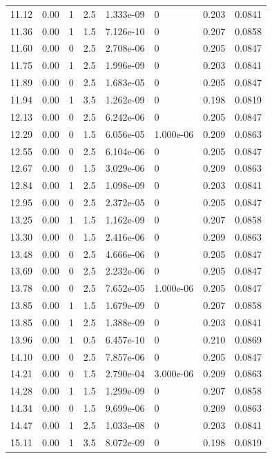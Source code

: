\documentclass[preview]{standalone}
\begin{document}
{{{\begin{tabular}{L{1.2cm}C{1.2cm} C{0.3cm}C{0.5cm} C{1.4cm}C{1.4cm} C{1.4cm}C{1.4cm}}
  11.12  &  0.00  & 1     & 2.5 &  1.333e-09  & 0  & 0.203 &  0.0841   \\ 
  11.36  &  0.00  & 1     & 1.5 &  7.126e-10  & 0  & 0.207 &  0.0858   \\ 
  11.60  &  0.00  & 0     & 2.5 &  2.708e-06  & 0  & 0.205 &  0.0847   \\ 
  11.75  &  0.00  & 1     & 2.5 &  1.996e-09  & 0  & 0.203 &  0.0841   \\ 
  11.89  &  0.00  & 0     & 2.5 &  1.683e-05  & 0  & 0.205 &  0.0847   \\ 
  11.94  &  0.00  & 1     & 3.5 &  1.262e-09  & 0  & 0.198 &  0.0819   \\ 
  12.13  &  0.00  & 0     & 2.5 &  6.242e-06  & 0  & 0.205 &  0.0847   \\ 
  12.29  &  0.00  & 0     & 1.5 &  6.056e-05  & 1.000e-06  & 0.209 &  0.0863   \\ 
  12.55  &  0.00  & 0     & 2.5 &  6.104e-06  & 0  & 0.205 &  0.0847   \\ 
  12.67  &  0.00  & 0     & 1.5 &  3.029e-06  & 0  & 0.209 &  0.0863   \\ 
  12.84  &  0.00  & 1     & 2.5 &  1.098e-09  & 0  & 0.203 &  0.0841   \\ 
  12.95  &  0.00  & 0     & 2.5 &  2.372e-05  & 0  & 0.205 &  0.0847   \\ 
  13.25  &  0.00  & 1     & 1.5 &  1.162e-09  & 0  & 0.207 &  0.0858   \\ 
  13.30  &  0.00  & 0     & 1.5 &  2.416e-06  & 0  & 0.209 &  0.0863   \\ 
  13.48  &  0.00  & 0     & 2.5 &  4.666e-06  & 0  & 0.205 &  0.0847   \\ 
  13.69  &  0.00  & 0     & 2.5 &  2.232e-06  & 0  & 0.205 &  0.0847   \\ 
  13.78  &  0.00  & 0     & 2.5 &  7.652e-05  & 1.000e-06  & 0.205 &  0.0847   \\ 
  13.85  &  0.00  & 1     & 1.5 &  1.679e-09  & 0  & 0.207 &  0.0858   \\ 
  13.85  &  0.00  & 1     & 2.5 &  1.388e-09  & 0  & 0.203 &  0.0841   \\ 
  13.96  &  0.00  & 1     & 0.5 &  6.457e-10  & 0  & 0.210 &  0.0869   \\ 
  14.10  &  0.00  & 0     & 2.5 &  7.857e-06  & 0  & 0.205 &  0.0847   \\ 
  14.21  &  0.00  & 0     & 1.5 &  2.790e-04  & 3.000e-06  & 0.209 &  0.0863   \\ 
  14.28  &  0.00  & 1     & 1.5 &  1.299e-09  & 0  & 0.207 &  0.0858   \\ 
  14.34  &  0.00  & 0     & 1.5 &  9.699e-06  & 0  & 0.209 &  0.0863   \\ 
  14.47  &  0.00  & 1     & 2.5 &  1.033e-08  & 0  & 0.203 &  0.0841   \\ 
  15.11  &  0.00  & 1     & 3.5 &  8.072e-09  & 0  & 0.198 &  0.0819   \\ 
\hline 
\end{tabular} 

}}}
\end{document}
